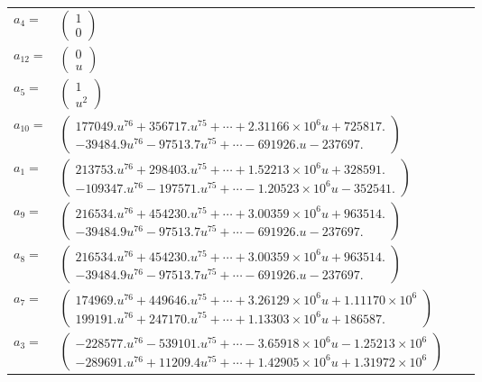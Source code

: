 \documentclass[1p]{elsarticle_modified}
\theoremstyle{definition}
\begin{document}
\begin{tabular}{m{7pt} m{180pt} m{7pt} m{180pt} }
\flushright $a_{4}=$&$\begin{pmatrix}1\\0\end{pmatrix}$ \\
\flushright $a_{12}=$&$\begin{pmatrix}0\\u\end{pmatrix}$ \\
\flushright $a_{5}=$&$\begin{pmatrix}1\\u^2\end{pmatrix}$ \\
\flushright $a_{10}=$&$\begin{pmatrix}177049. u^{76}+356717. u^{75}+\cdots+2.31166\times10^{6} u+725817.\\-39484.9 u^{76}-97513.7 u^{75}+\cdots-691926. u-237697.\end{pmatrix}$ \\
\flushright $a_{1}=$&$\begin{pmatrix}213753. u^{76}+298403. u^{75}+\cdots+1.52213\times10^{6} u+328591.\\-109347. u^{76}-197571. u^{75}+\cdots-1.20523\times10^{6} u-352541.\end{pmatrix}$ \\
\flushright $a_{9}=$&$\begin{pmatrix}216534. u^{76}+454230. u^{75}+\cdots+3.00359\times10^{6} u+963514.\\-39484.9 u^{76}-97513.7 u^{75}+\cdots-691926. u-237697.\end{pmatrix}$ \\
\flushright $a_{8}=$&$\begin{pmatrix}216534. u^{76}+454230. u^{75}+\cdots+3.00359\times10^{6} u+963514.\\-39484.9 u^{76}-97513.7 u^{75}+\cdots-691926. u-237697.\end{pmatrix}$ \\
\flushright $a_{7}=$&$\begin{pmatrix}174969. u^{76}+449646. u^{75}+\cdots+3.26129\times10^{6} u+1.11170\times10^{6}\\199191. u^{76}+247170. u^{75}+\cdots+1.13303\times10^{6} u+186587.\end{pmatrix}$ \\
\flushright $a_{3}=$&$\begin{pmatrix}-228577. u^{76}-539101. u^{75}+\cdots-3.65918\times10^{6} u-1.25213\times10^{6}\\-289691. u^{76}+11209.4 u^{75}+\cdots+1.42905\times10^{6} u+1.31972\times10^{6}\end{pmatrix}$ \\

\end{tabular}
\end{document}
